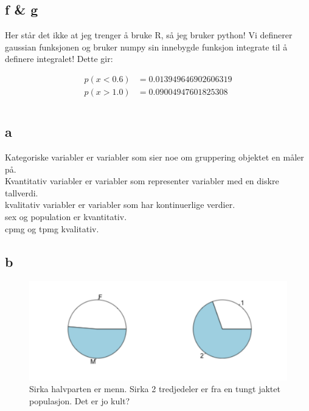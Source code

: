 \subsection*{f \& g}
Her står det ikke at jeg trenger å bruke R, så jeg bruker python! Vi definerer gaussian funksjonen og bruker numpy sin innebygde funksjon integrate
til å definere integralet! Dette gir:

\begin{align*}
    p(x<0.6) &= 0.013949646902606319
    \\
    p(x>1.0) &= 0.09004947601825308
\end{align*}



























\pagebreak
\section{}


\subsection*{a}

Kategoriske variabler er variabler som sier noe om gruppering objektet en måler på.
\\
Kvantitativ variabler er variabler som representer variabler med en diskre tallverdi.
\\
kvalitativ variabler er variabler som har kontinuerlige verdier. 
\\
sex og population er kvantitativ.
\\
cpmg og tpmg kvalitativ.

\subsection*{b}

\begin{figure}[H]
		\centering
		\includegraphics[width=0.7\linewidth]{wolf_sex.png}
		\caption{Sirka halvparten er menn. Sirka 2 tredjedeler er fra en tungt jaktet populasjon. Det er jo kult?}
		\label{fig:sex_population}
\end{figure}


